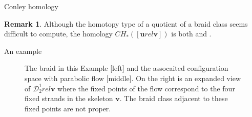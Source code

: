 \documentclass[9pt, english]{beamer}
\theoremstyle{definition}
\newtheorem{oss}[thm]{Remark}
\newcommand{\simbolovettore}[1]{{\boldsymbol{#1}}}
\newcommand{\vu}{\simbolovettore{u}}
\newcommand{\vv}{\simbolovettore{v}}
\begin{document}
\begin{frame}{Conley homology}
    \begin{oss}\pause
    Although the homotopy type of a quotient of a braid class seems
    difficult to compute, the homology $CH_*([\vu rel \vv])$ is both
    {\color{red}{efficacious}\/} and {\color{red}{computable}.\/}
    \end{oss}
\end{frame}
\begin{frame}{An example}
\begin{figure}\label{fig:example}
        \caption{The braid in this Example [left]
        and the assocaited configuration space with parabolic flow [middle]. On the right is an expanded view
         of $\mathscr D_2^1 rel \vv$ where the fixed points of the flow correspond to the four fixed strands in the
         skeleton $\vv$. The braid class adjacent to these fixed points are not proper.}
        \end{figure}
\end{frame}
\end{document}
